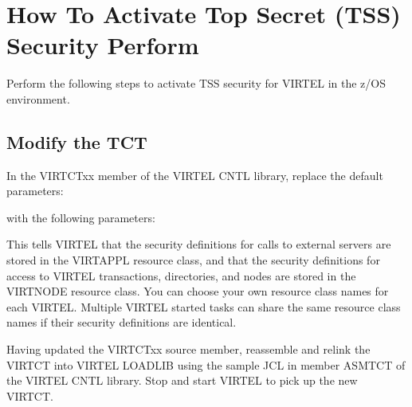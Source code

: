 \documentclass[letterpaper,10pt,english]{sphinxmanual}
\begin{document}
\section{How To Activate Top Secret (TSS) Security Perform}
\label{\detokenize{Installation_Guide:how-to-activate-top-secret-tss-security-perform}}\label{\detokenize{Installation_Guide:index-184}}
Perform the following steps to activate TSS security for VIRTEL in the z/OS environment.


\subsection{Modify the TCT}
\label{\detokenize{Installation_Guide:modify-the-tct}}
In the VIRTCTxx member of the VIRTEL CNTL library, replace the default parameters:

\begin{sphinxVerbatim}[commandchars=\\\{\}]
\end{sphinxVerbatim}

with the following parameters:

\begin{sphinxVerbatim}[commandchars=\\\{\}]
\end{sphinxVerbatim}

This tells VIRTEL that the security definitions for calls to external servers are stored in the VIRTAPPL resource class, and that the security definitions for access to VIRTEL transactions, directories, and nodes are stored in the VIRTNODE resource class. You can choose your own resource class names for each VIRTEL.  Multiple VIRTEL started tasks can share the same resource class names if their security definitions are identical.

Having updated the VIRTCTxx source member, reassemble and relink the VIRTCT into VIRTEL LOADLIB using the sample JCL in member ASMTCT of the VIRTEL CNTL library. Stop and start VIRTEL to pick up the new VIRTCT.

\ignorespaces 
\end{document}
